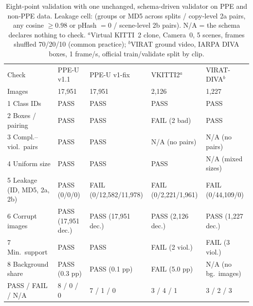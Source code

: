 \begin{table}[t]
\centering\footnotesize
\caption{Eight-point validation with one unchanged, schema-driven validator on PPE and non-PPE data. Leakage cell: (groups or MD5 across splits / copy-level 2a pairs, any cosine $\ge0.98$ or pHash $=0$ / scene-level 2b pairs). N/A = the schema declares nothing to check. $^a$Virtual KITTI~2 clone, Camera~0, 5 scenes, frames shuffled 70/20/10 (common practice); $^b$VIRAT ground video, IARPA DIVA boxes, 1 frame/s, official train/validate split by clip.}
\label{tab:generality}
\begin{tabular}{lllll}
\toprule
Check & PPE-U v1.1 & PPE-U v1-fix & VKITTI2$^a$ & VIRAT-DIVA$^b$ \\
Images & 17{,}951 & 17{,}951 & 2{,}126 & 1{,}227 \\
\midrule
1 Class IDs & PASS & PASS & PASS & PASS \\
2 Boxes / pairing & PASS & PASS & FAIL (2 bad) & PASS \\
3 Compl.--viol.\ pairs & PASS & PASS & N/A (no pairs) & N/A (no pairs) \\
4 Uniform size & PASS & PASS & PASS & N/A (mixed sizes) \\
5 Leakage (ID, MD5, 2a, 2b) & PASS (0/0/0) & FAIL (0/12{,}582/11{,}978) & FAIL (0/2{,}221/1{,}961) & FAIL (0/44{,}109/0) \\
6 Corrupt images & PASS (17{,}951 dec.) & PASS (17{,}951 dec.) & PASS (2{,}126 dec.) & PASS (1{,}227 dec.) \\
7 Min.\ support & PASS & PASS & FAIL (2 viol.) & FAIL (3 viol.) \\
8 Background share & PASS (0.3 pp) & PASS (0.1 pp) & FAIL (5.0 pp) & N/A (no bg.\ images) \\
\midrule
PASS / FAIL / N/A & 8 / 0 / 0 & 7 / 1 / 0 & 3 / 4 / 1 & 3 / 2 / 3 \\
\bottomrule
\end{tabular}
\end{table}